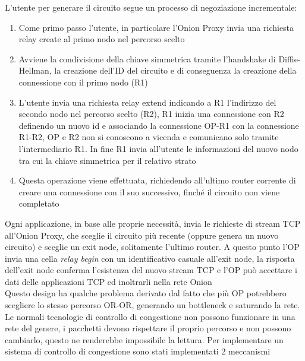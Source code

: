 L'utente per generare il circuito segue un processo di negoziazione incrementale:
\begin{enumerate}
    \item Come primo passo l'utente, in particolare l'Onion Proxy invia una richiesta relay create al primo nodo nel percorso scelto
    \item Avviene la condivisione della chiave simmetrica tramite l'handshake di Diffie-Hellman, la creazione dell'ID del circuito e di conseguenza la creazione della connessione con il primo nodo (R1)
    \item L'utente invia una richiesta relay extend indicando a R1 l'indirizzo del secondo nodo nel percorso scelto (R2), R1 inizia una connessione con R2 definendo un nuovo id e associando la connessione OP-R1 con la connessione R1-R2, OP e R2 non si conoscono a vicenda e comunicano solo tramite l'intermediario R1. In fine R1 invia all'utente le informazioni del nuovo nodo tra cui la chiave simmetrica per il relativo strato
    \item Questa operazione viene effettuata, richiedendo all'ultimo router corrente di creare una connessione con il suo successivo, finché il circuito non viene completato\cite{ChaumMixes}
\end{enumerate}
\par
Ogni applicazione, in base alle proprie necessità, invia le richieste di stream TCP all'Onion Proxy, che sceglie il circuito più recente (oppure genera un nuovo circuito) e sceglie un exit node, solitamente l'ultimo router. A questo punto l'OP invia una cella \emph{relay begin} con un identificativo casuale all'exit node, la risposta dell'exit node conferma l'esistenza del nuovo stream TCP e l'OP può accettare i dati delle applicazioni TCP ed inoltrarli nella rete Onion \\
Questo design ha qualche problema derivato dal fatto che più OP potrebbero scegliere lo stesso percorso OR-OR, generando un bottleneck e saturando la rete. Le normali tecnologie di controllo di congestione non possono funzionare in una rete del genere, i pacchetti devono rispettare il proprio percorso e non possono cambiarlo, questo ne renderebbe impossibile la lettura. Per implementare un sistema di controllo di congestione sono stati implementati 2 meccanismi
